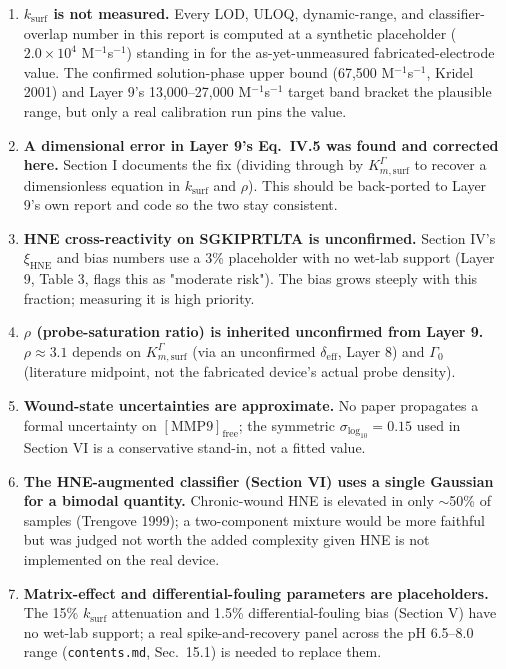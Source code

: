 \documentclass[11pt]{article}
\numberwithin{equation}{section}
\newcommand{\code}[1]{\texttt{#1}}
\begin{document}
\begin{enumerate}[leftmargin=*, itemsep=6pt]
\item \textbf{$k_{\mathrm{surf}}$ is not measured.} Every LOD, ULOQ, dynamic-range, and classifier-overlap
number in this report is computed at a synthetic placeholder ($2.0\times10^4$ M$^{-1}$s$^{-1}$) standing in
for the as-yet-unmeasured fabricated-electrode value. The confirmed solution-phase upper bound
(67{,}500 M$^{-1}$s$^{-1}$, Kridel 2001) and Layer 9's 13{,}000--27{,}000 M$^{-1}$s$^{-1}$ target band bracket
the plausible range, but only a real calibration run pins the value.

\item \textbf{A dimensional error in Layer 9's Eq.\ IV.5 was found and corrected here.} Section I documents
the fix (dividing through by $K_{m,\mathrm{surf}}^{\Gamma}$ to recover a dimensionless equation in
$k_{\mathrm{surf}}$ and $\rho$). This should be back-ported to Layer 9's own report and code so the two stay
consistent.

\item \textbf{HNE cross-reactivity on SGKIPRTLTA is unconfirmed.} Section IV's $\xi_{\mathrm{HNE}}$ and bias
numbers use a 3\% placeholder with no wet-lab support (Layer 9, Table 3, flags this as "moderate risk"). The
bias grows steeply with this fraction; measuring it is high priority.

\item \textbf{$\rho$ (probe-saturation ratio) is inherited unconfirmed from Layer 9.} $\rho\approx3.1$ depends
on $K_{m,\mathrm{surf}}^{\Gamma}$ (via an unconfirmed $\delta_{\mathrm{eff}}$, Layer 8) and $\Gamma_0$
(literature midpoint, not the fabricated device's actual probe density).

\item \textbf{Wound-state uncertainties are approximate.} No paper propagates a formal uncertainty on
$[\mathrm{MMP9}]_{\mathrm{free}}$; the symmetric $\sigma_{\log_{10}}=0.15$ used in Section VI is a
conservative stand-in, not a fitted value.

\item \textbf{The HNE-augmented classifier (Section VI) uses a single Gaussian for a bimodal quantity.}
Chronic-wound HNE is elevated in only $\sim$50\% of samples (Trengove 1999); a two-component mixture would be
more faithful but was judged not worth the added complexity given HNE is not implemented on the real device.

\item \textbf{Matrix-effect and differential-fouling parameters are placeholders.} The 15\% $k_{\mathrm{surf}}$
attenuation and 1.5\% differential-fouling bias (Section V) have no wet-lab support; a real spike-and-recovery
panel across the pH 6.5--8.0 range (\code{contents.md}, Sec.\ 15.1) is needed to replace them.
\end{enumerate}
\end{document}
